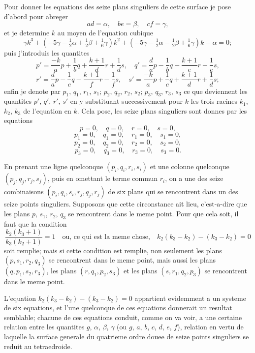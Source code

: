 \documentclass[11pt,a4paper]{article}
\theoremstyle{plain}
\begin{document}
Pour donner les equations des seize plans singuliers de cette surface je pose d'abord pour abreger
\[
ad = \alpha, \quad be = \beta, \quad cf = \gamma,
\]
et je determine $k$ au moyen de l'equation cubique
\[
\gamma k^3 + (-5\gamma - \tfrac12\alpha + \tfrac12\beta + \tfrac16\gamma)k^2 + (-5\gamma - \tfrac12\alpha - \tfrac12\beta + \tfrac16\gamma)k - \alpha = 0;
\]
puis j'introduis les quantites
\[
p' = \frac{-k}{a}p + \frac{1}{b}q + \frac{k+1}{d}r + \frac{1}{d}s, \quad
q' = \frac{d}{a}p - \frac{1}{b}q - \frac{k+1}{e}r - \frac{1}{e}s,
\]
\[
r' = \frac{d}{a}p - \frac{1}{c}q - \frac{k+1}{f}r - \frac{1}{f}s, \quad
s' = \frac{-k}{a}p + \frac{1}{c}q + \frac{k+1}{d}r + \frac{1}{d}s;
\]
enfin je denote par $p_1$, $q_1$, $r_1$, $s_1$; $p_2$, $q_2$, $r_2$, $s_2$; $p_3$, $q_3$, $r_3$, $s_3$ ce que deviennent les quantites $p'$, $q'$, $r'$, $s'$ en y substituant successivement pour $k$ les trois racines $k_1$, $k_2$, $k_3$ de l'equation en $k$. Cela pose, les seize plans singuliers sont donnes par les equations
\[
p = 0, \quad q = 0, \quad r = 0, \quad s = 0,
\]
\[
p_1 = 0, \quad q_1 = 0, \quad r_1 = 0, \quad s_1 = 0,
\]
\[
p_2 = 0, \quad q_2 = 0, \quad r_2 = 0, \quad s_2 = 0,
\]
\[
p_3 = 0, \quad q_3 = 0, \quad r_3 = 0, \quad s_3 = 0.
\]

En prenant une ligne quelconque $(p_i, q_i, r_i, s_i)$ et une colonne quelconque $(p_j, q_j, r_j, s_j)$, puis en omettant le terme commun $r_i$, on a une des seize combinaisons $(p_i, q_i, s_i, r_j, q_j, r_j)$ de six plans qui se rencontrent dans un des seize points singuliers. Supposons que cette circonstance ait lieu, c'est-a-dire que les plans $p$, $s_1$, $r_2$, $q_3$ se rencontrent dans le meme point. Pour que cela soit, il faut que la condition
\[
\frac{k_2(k_3+1)}{k_3(k_2+1)} = 1 \quad \text{ou, ce qui est la meme chose,} \quad
k_2(k_3 - k_2) - (k_3 - k_2) = 0
\]
soit remplie; mais si cette condition est remplie, non seulement les plans $(p, s_1, r_2, q_3)$ se rencontrent dans le meme point, mais aussi les plans $(q, p_1, s_2, r_3)$, les plans $(r, q_1, p_2, s_3)$ et les plans $(s, r_1, q_2, p_3)$ se rencontrent dans le meme point.

L'equation $k_2(k_3 - k_2) - (k_3 - k_2) = 0$ appartient evidemment a un systeme de six equations, et l'une quelconque de ces equations donnerait un resultat semblable; chacune de ces equations conduit, comme on va voir, a une certaine relation entre les quantites $g$, $\alpha$, $\beta$, $\gamma$ (ou $g$, $a$, $b$, $c$, $d$, $e$, $f$), relation en vertu de laquelle la surface generale du quatrieme ordre douee de seize points singuliers se reduit au tetraedroide.
\end{document}
